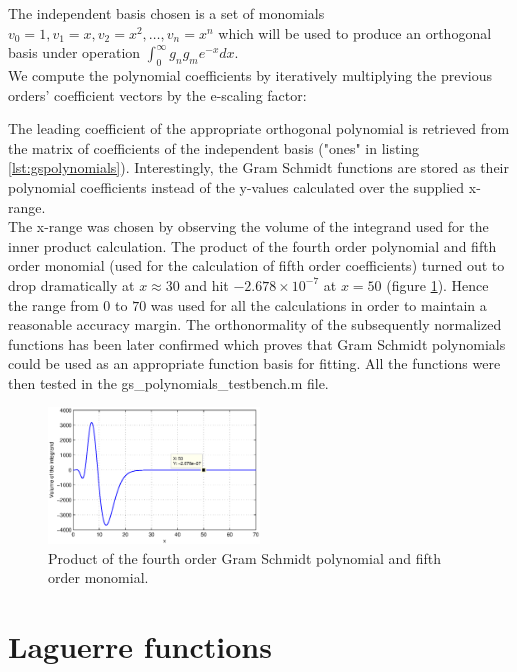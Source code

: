 \documentclass[a4paper]{article}
\numberwithin{equation}{section}
\begin{document}
The independent basis chosen is a set of monomials $v_0 = 1, v_1 = x, v_2 = x^2, \ldots, v_n=x^n$ which will be used to produce an orthogonal basis under operation $\int_{0}^{\infty} g_n g_m e^{-x} dx$.\\
We compute the polynomial coefficients by iteratively multiplying the previous orders' coefficient vectors by the e-scaling factor:



\noindent The leading coefficient of the appropriate orthogonal polynomial is retrieved from the matrix of coefficients of the independent basis ("ones" in listing \ref{lst:gspolynomials}). Interestingly, the Gram Schmidt functions are stored as their polynomial coefficients instead of the y-values calculated over the supplied x-range. \\

\noindent The x-range was chosen by observing the volume of the integrand used for the inner product calculation. The product of the fourth order polynomial and fifth order monomial (used for the calculation of fifth order coefficients) turned out to drop dramatically at $x \approx 30$ and hit $-2.678 \times 10^{-7}$ at $x=50$ (figure \ref{fig:integrand}). Hence the range from $0$ to $70$ was used for all the calculations in order to maintain a reasonable accuracy margin. The orthonormality of the subsequently normalized functions has been later confirmed which proves that Gram Schmidt polynomials could be used as an appropriate function basis for fitting. All the functions were then tested in the gs\_polynomials\_testbench.m file.

\begin{figure}
\centering
\includegraphics[width=0.5\textwidth]{integrand.eps}
\caption{\label{fig:integrand}Product of the fourth order Gram Schmidt polynomial and fifth order monomial.}
\end{figure}

\section{Laguerre functions}
\end{document}
